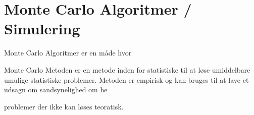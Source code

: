 \documentclass[../SRP.tex]{subfiles}
\begin{document}
\chapter{Monte Carlo Algoritmer / Simulering}

Monte Carlo Algoritmer er en måde hvor 

Monte Carlo Metoden er en metode inden for statistiske til at løse umiddelbare 
umulige statistiske problemer. Metoden er empirisk og kan bruges til at lave et
udsagn om sandsynelighed om he 

problemer der ikke kan løses teoratisk.
\end{document}
